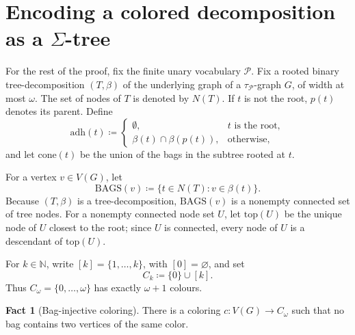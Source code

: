 \documentclass[11pt]{article}
\theoremstyle{definition}
\newtheorem*{fact}{Fact}
\newcommand{\defeq}{\coloneqq}
\newcommand{\Bags}{\mathrm{BAGS}}
\newcommand{\adh}{\mathrm{adh}}
\newcommand{\cone}{\mathrm{cone}}
\newcommand{\topnode}{\mathrm{top}}
\newcommand{\Pred}{\mathcal P}
\begin{document}
\section{Encoding a colored decomposition as a \texorpdfstring{\(\Sigma\)}{Sigma}-tree}

For the rest of the proof, fix the finite unary vocabulary \(\Pred\).  Fix a
rooted binary tree-decomposition \((T,\beta)\) of the underlying graph of a
\(\tau_{\Pred}\)-graph \(G\), of width at most \(\omega\).  The set of nodes of
\(T\) is denoted by \(N(T)\).  If \(t\) is not the root, \(p(t)\) denotes its
parent.  Define
\[
  \adh(t) \defeq
  \begin{cases}
    \emptyset, & t \text{ is the root},\\
    \beta(t)\cap\beta(p(t)), & \text{otherwise},
  \end{cases}
\]
and let \(\cone(t)\) be the union of the bags in the subtree rooted at \(t\).

For a vertex \(v\in V(G)\), let
\[
  \Bags(v)\defeq \{t\in N(T): v\in \beta(t)\}.
\]
Because \((T,\beta)\) is a tree-decomposition, \(\Bags(v)\) is a nonempty
connected set of tree nodes.  For a nonempty connected node set \(U\), let
\(\topnode(U)\) be the unique node of \(U\) closest to the root; since \(U\) is
connected, every node of \(U\) is a descendant of \(\topnode(U)\).

For \(k\in\mathbb N\), write \([k]=\{1,\ldots,k\}\), with \([0]=\varnothing\), and
set
\[
  C_k\defeq\{0\}\cup[k].
\]
Thus \(C_\omega=\{0,\ldots,\omega\}\) has exactly \(\omega+1\) colours.

\begin{fact}[Bag-injective coloring]
There is a coloring \(c:V(G)\to C_\omega\) such that no bag contains two vertices
of the same color.
\end{fact}
\end{document}
